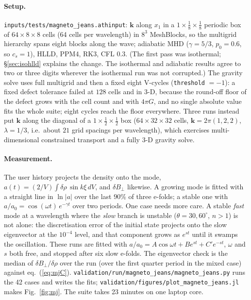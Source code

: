 \documentclass[11pt]{article}
\newcommand{\code}[1]{\texttt{#1}}
\newcommand{\file}[1]{\texttt{#1}}
\begin{document}
\paragraph{Setup.} \file{inputs/tests/magneto\_jeans.athinput}: $\mathbf k$ along $x_1$ in a
$1\times\frac18\times\frac18$ periodic box of $64\times8\times8$ cells (64 cells per
wavelength) in $8^3$ MeshBlocks, so the multigrid hierarchy spans eight blocks along the
wave; adiabatic MHD ($\gamma = 5/3$, $p_0 = 0.6$, so $c_s = 1$), HLLD, PPM4, RK3, CFL
$0.3$. (The first pass was isothermal; \S\ref{sec:isohlld} explains the change. The
isothermal and adiabatic results agree to two or three digits wherever the isothermal run
was not corrupted.) The gravity solve uses full multigrid and
then a fixed eight V-cycles (\code{threshold} $= -1$): a fixed defect tolerance failed at
$128$ cells and in 3-D, because the round-off floor of the defect grows with the cell count
and with $4\pi G$, and no single absolute value fits the whole suite; eight cycles reach
the floor everywhere. Three runs instead put $\mathbf k$ along the diagonal of a
$1\times\frac12\times\frac12$ box ($64\times32\times32$ cells, $\mathbf k = 2\pi(1,2,2)$,
$\lambda = 1/3$, i.e.\ about $21$ grid spacings per wavelength), which exercises
multi-dimensional constrained transport and a fully 3-D gravity solve.

\paragraph{Measurement.} The user history projects the density onto the mode,
$a(t) = (2/V)\int\delta\rho\,\sin k\xi\,dV$, and $\delta B_\perp$ likewise. A growing mode is
fitted with a straight line in $\ln|a|$ over the last $90\%$ of three e-folds; a stable one with
$a/a_0 = \cos(\omega t)\,e^{-\gamma t}$ over two periods. One case needs more care. A
stable \emph{fast} mode at a wavelength where the \emph{slow} branch is unstable
($\theta = 30, 60^\circ$, $n > 1$) is not alone: the discretisation error of the initial
state projects onto the slow eigenvector at the $10^{-4}$ level, and that component grows as
$e^{st}$ until it swamps the oscillation. These runs are fitted with
$a/a_0 = A\cos\omega t + B e^{st} + C' e^{-st}$, $\omega$ and $s$ both free, and stopped
after six slow e-folds. The eigenvector check is the median of $\delta B_\perp/\delta\rho$
over the run (over the first quarter period in the mixed case) against eq.~(\ref{eq:mjC}).
\file{validation/run/magneto\_jeans/magneto\_jeans.py} runs the 42 cases and writes the fits;
\file{validation/figures/plot\_magneto\_jeans.jl} makes Fig.~\ref{fig:mj}. The suite takes
23 minutes on one laptop core.
\end{document}
